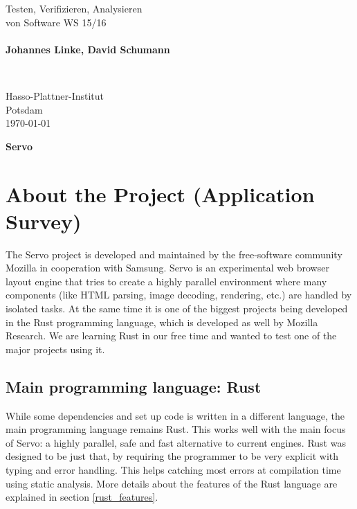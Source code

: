 \documentclass{scrartcl}
\begin{document}
\pagestyle{plain}


\noindent
\begin{minipage}{0.66\textwidth}
Testen, Verifizieren, Analysieren\\
von Software WS 15/16\\
~\\
\textbf{Johannes Linke, David Schumann}
\end{minipage}
~
\begin{minipage}{0.30\textwidth}
Hasso-Plattner-Institut\\
Potsdam\\
\today
\end{minipage}


\begin{center}
 \huge \bf Servo
\end{center}

\section{About the Project (Application Survey)}

The Servo project is developed and maintained by the free-software community Mozilla in cooperation with Samsung. Servo is an experimental web browser layout engine that tries to create a highly parallel environment where many components (like HTML parsing, image decoding, rendering, etc.) are handled by isolated tasks. At the same time it is one of the biggest projects being developed in the Rust programming language, which is developed as well by Mozilla Research. We are learning Rust in our free time and wanted to test one of the major projects using it.

\subsection{Main programming language: Rust}
While some dependencies and set up code is written in a different language, the main programming language remains Rust. This works well with the main focus of Servo: a highly parallel, safe and fast alternative to current engines. Rust was designed to be just that, by requiring the programmer to be very explicit with typing and error handling. This helps catching most errors at compilation time using static analysis. More details about the features of the Rust language are explained in section \ref{rust_features}.
\end{document}
